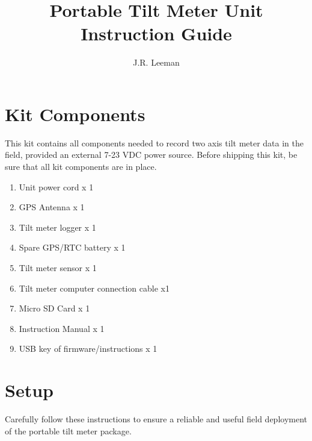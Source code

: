 \documentclass[11pt]{article} %
\title{Portable Tilt Meter Unit Instruction Guide}
\author{J.R. Leeman}
\date{} %
\begin{document}
\maketitle

\section{Kit Components}

This kit contains all components needed to record two axis tilt meter data in the field, provided an external 7-23 VDC power source. Before shipping this kit, be sure that all kit components are in place.

\begin{enumerate}
\item Unit power cord x 1
\item GPS Antenna x 1
\item Tilt meter logger x 1
\item Spare GPS/RTC battery x 1
\item Tilt meter sensor x 1
\item Tilt meter computer connection cable x1
\item Micro SD Card x 1
\item Instruction Manual x 1
\item USB key of firmware/instructions x 1
\end{enumerate}

\newpage
\section{Setup}
Carefully follow these instructions to ensure a reliable and useful field deployment of the portable tilt meter package. 
\end{document}
